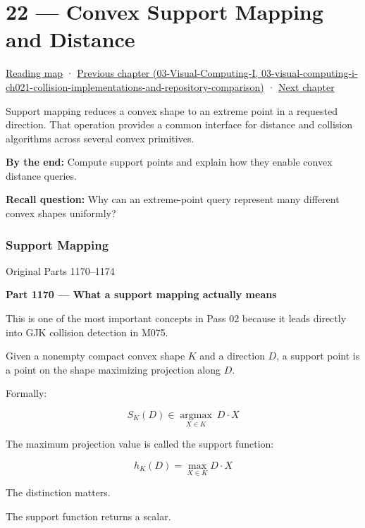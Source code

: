 \hypertarget{04-visual-computing-ii-ch022}{}
\chapter{22 --- Convex Support Mapping and Distance}\label{04-visual-computing-ii-ch022-convex-support-mapping-and-distance}

\hyperref[volume-reading-map]{Reading map} · \href{../03-Visual-Computing-I/main.pdf\#nameddest=03-visual-computing-i-ch021-collision-implementations-and-repository-comparison}{Previous chapter (03-Visual-Computing-I, 03-visual-computing-i-ch021-collision-implementations-and-repository-comparison)} · \hyperref[04-visual-computing-ii-ch023-mesh-topology-and-connectivity]{Next chapter}

Support mapping reduces a convex shape to an extreme point in a requested direction. That operation provides a common interface for distance and collision algorithms across several convex primitives.

\textbf{By the end:} Compute support points and explain how they enable convex distance queries.

\textbf{Recall question:} Why can an extreme-point query represent many different convex shapes uniformly?

\subsection{Support Mapping}\label{04-visual-computing-ii-ch022-support-mapping}

Original Parts 1170--1174

\textbf{Part 1170 --- What a support mapping actually means}

This is one of the most important concepts in Pass 02 because it leads directly into GJK collision detection in M075.

Given a nonempty compact convex shape \(K\) and a direction \(D\), a support point is a point on the shape maximizing projection along \(D\).

Formally:

\[
\boxed{ S_K(D)\in \underset{X\in K}{\operatorname{argmax}} \ D\cdot X }
\]

The maximum projection value is called the support function:

\[
\boxed{ h_K(D)=\max_{X\in K}D\cdot X }
\]

The distinction matters.

The support function returns a scalar.

